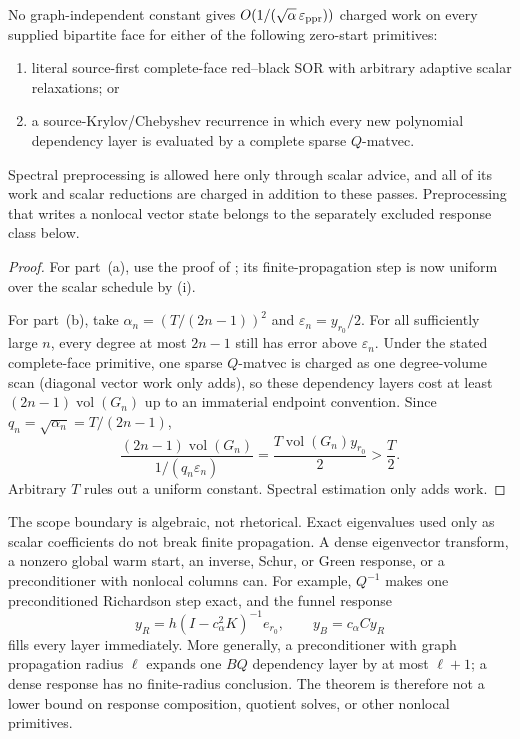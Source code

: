 \begin{corollary}
\label{cor:adaptive-polynomial-work-stop}
No graph-independent constant gives
$O(1/(\sqrt\alpha\,\varepsilon_{\rm ppr}))$ charged work on every supplied
bipartite face for either of the following zero-start primitives:
\begin{enumerate}[label=(\alph*),leftmargin=*]
 \item literal source-first complete-face red--black SOR with arbitrary
       adaptive scalar relaxations; or
 \item a source-Krylov/Chebyshev recurrence in which every new polynomial
       dependency layer is evaluated by a complete sparse $Q$-matvec.
\end{enumerate}
Spectral preprocessing is allowed here only through scalar advice, and all of
its work and scalar reductions are charged in addition to these passes.
Preprocessing that writes a nonlocal vector state belongs to the separately
excluded response class below.
\end{corollary}

\begin{proof}
For part~(a), use the proof of
; its finite-propagation step is now
uniform over the scalar schedule by
(i).

For part~(b), take $\alpha_n=(T/(2n-1))^2$ and
$\varepsilon_n=y_{r_0}/2$.  For all sufficiently large $n$, every degree at
most $2n-1$ still has error above $\varepsilon_n$.  Under the stated
complete-face primitive, one sparse $Q$-matvec is charged as one
degree-volume scan (diagonal vector work only adds), so these dependency
layers cost at least $(2n-1)\operatorname{vol}(G_n)$ up to an immaterial
endpoint convention.  Since $q_n=\sqrt{\alpha_n}=T/(2n-1)$,
\[
 \frac{(2n-1)\operatorname{vol}(G_n)}{1/(q_n\varepsilon_n)}
 =\frac{T\operatorname{vol}(G_n)y_{r_0}}2>\frac T2.
\]
Arbitrary $T$ rules out a uniform constant.  Spectral estimation only adds
work.
\end{proof}

The scope boundary is algebraic, not rhetorical.  Exact eigenvalues used
only as scalar coefficients do not break finite propagation.  A dense
eigenvector transform, a nonzero global warm start, an inverse, Schur, or
Green response, or a preconditioner with nonlocal columns can.  For example,
$Q^{-1}$ makes one preconditioned Richardson step exact, and the funnel
response
\[
 y_R=h(I-c_\alpha^2K)^{-1}e_{r_0},\qquad y_B=c_\alpha Cy_R
\]
fills every layer immediately.  More generally, a preconditioner with graph
propagation radius $\ell$ expands one $BQ$ dependency layer by at most
$\ell+1$; a dense response has no finite-radius conclusion.  The theorem is
therefore not a lower bound on response composition, quotient solves, or
other nonlocal primitives.

